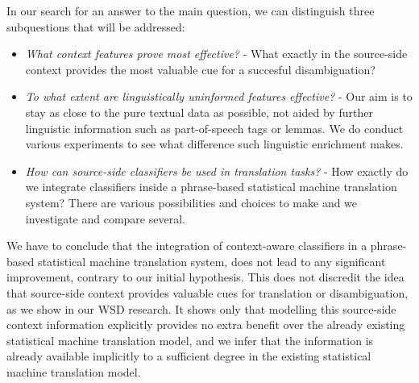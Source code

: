 In our search for an answer to the main question, we can distinguish three subquestions that will be addressed:

\begin{itemize}
\item \emph{What context features prove most effective?} - What exactly in the source-side context provides the most valuable cue for a succesful disambiguation?
\item \emph{To what extent are linguistically uninformed features effective?} -  Our aim is to stay as close to the pure
    textual data as possible, not aided by further linguistic information such as part-of-speech tags or lemmas. We do
    conduct various experiments to see what difference such linguistic enrichment makes.
\item \emph{How can source-side classifiers be used in translation tasks?} - How exactly do we integrate classifiers inside a phrase-based statistical machine translation system? There are various possibilities and choices to make and we investigate and compare several.
\end{itemize}

We have to conclude that the integration of context-aware classifiers in a
phrase-based statistical machine translation system, does not lead to any
significant improvement, contrary to our initial hypothesis. This does not
discredit the idea that source-side context provides valuable cues for
translation or disambiguation, as we show in our WSD research.  It shows only
that modelling this source-side context information explicitly provides no
extra benefit over the already existing statistical machine translation model, and we infer
that the information is already available implicitly to a sufficient degree in the
existing statistical machine translation model.

